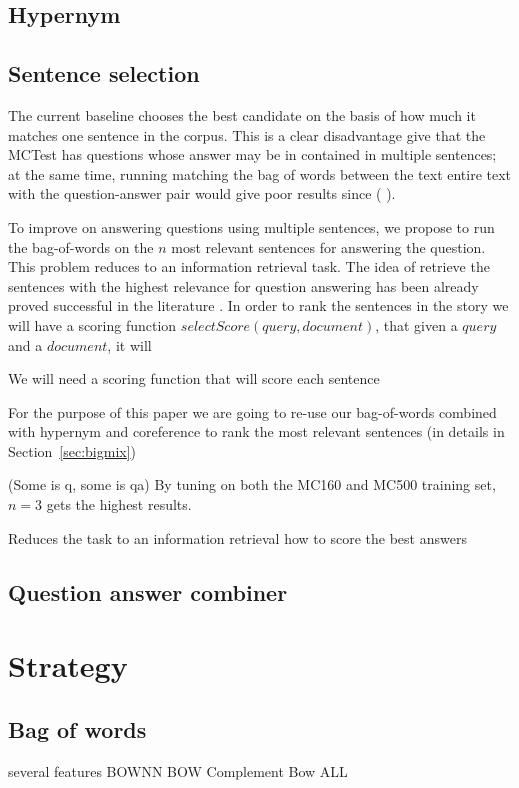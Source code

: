 \documentclass[11pt]{article}
\begin{document}
\subsection{Hypernym}
\subsection{Sentence selection}
The current baseline chooses the best candidate on the basis of how much it matches one sentence in the corpus.
This is a clear disadvantage give that the MCTest has questions whose answer may be in contained in multiple sentences;
at the same time, running matching the bag of words between the text entire text with the question-answer pair would give poor results  since (%
).

To improve on answering questions using multiple sentences, we propose to run the bag-of-words on the $n$ most relevant sentences for answering the question.
This problem reduces to an information retrieval task.
The idea of retrieve the sentences with the highest relevance for question answering has been already proved successful in the literature \cite{qa_techniques, deep_selection}.
In order to rank the sentences in the story we will have a scoring function $selectScore(query, document)$, that given a $query$ and a $document$, it will %

We will need a scoring function that will score each sentence

 For the purpose of this paper we are going to re-use our bag-of-words combined with hypernym and coreference to rank the most relevant sentences (in details in Section~\ref{sec:bigmix})



(Some is q, some is qa)  By tuning on both the {\small MC160} and {\small MC500} training set, $n=3$ gets the highest results.

Reduces the task to an information retrieval
how to score the best answers

\subsection{Question answer combiner}

\section{Strategy}
\subsection{Bag of words}
\label{sec:bagofwords}
several features
BOWNN
BOW Complement
Bow ALL
\end{document}

